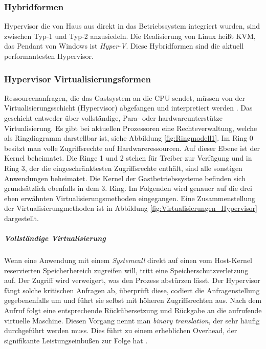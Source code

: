 \subsubsection{Hybridformen}
Hypervisor die von Haus aus direkt in das Betriebssystem integriert wurden, sind zwischen Typ-1 und Typ-2 anzusiedeln. Die Realisierung von Linux heißt \ac{KVM}, das Pendant von Windows ist \emph{Hyper-V}. Diese Hybridformen sind die aktuell performantesten Hypervisor. 

\subsubsection{Hypervisor Virtualisierungsformen}
 Ressourcenanfragen, die das Gastsystem an die CPU sendet, müssen von der Virtualisierungsschicht (Hypervisor) abgefangen und interpretiert werden \cite{Meinel2011VirtualisierungMarktubersicht}. Das geschieht entweder über vollständige, Para- oder hardwareunterstütze Virtualisierung.  Es gibt bei aktuellen Prozessoren eine Rechteverwaltung, welche als Ringdiagramm darstellbar ist, siehe Abbildung \ref{fig:Ringmodell1}. Im Ring 0 besitzt man volle Zugriffsrechte auf Hardwareressourcen. Auf dieser Ebene ist der Kernel beheimatet. Die Ringe 1 und 2 stehen für Treiber zur Verfügung und in Ring 3, der die eingeschränktesten Zugriffsrechte enthält, sind alle sonstigen Anwendungen beheimatet. Die Kernel der Gastbetriebssysteme befinden sich grundsätzlich ebenfalls in dem 3. Ring. Im Folgenden wird genauer auf die drei eben erwähnten Virtualisierungsmethoden eingegangen. Eine Zusammenstellung der Virtualisierungmethoden ist in Abbildung \ref{fig:Virtualisierungen_Hypervisor} dargestellt.

\subparagraph{Vollständige Virtualisierung}
 Wenn eine Anwendung mit einem \emph{Systemcall} direkt auf einen vom Host-Kernel reservierten Speicherbereich zugreifen will, tritt eine Speicherschutzverletzung auf. Der Zugriff wird verweigert, was den Prozess abstürzen lässt. Der Hypervisor fängt solche kritischen Anfragen ab, überprüft diese, codiert die Anfragenstellung gegebenenfalls um und führt sie selbst mit höheren Zugriffsrechten aus. Nach dem Aufruf folgt eine entsprechende Rückübersetzung und Rückgabe an die aufrufende virtuelle Maschine. Diesen Vorgang nennt man \emph{binary translation}, der sehr häufig durchgeführt werden muss. Dies führt zu einem erheblichen Overhead, der signifikante Leistungseinbußen zur Folge hat \cite{Meinel2011VirtualisierungMarktubersicht}. 
 
